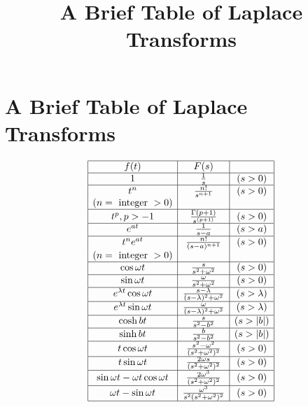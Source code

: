 \documentclass{ximera}
\title{A Brief Table of Laplace Transforms}%
\begin{document}
 
\begin{abstract}
 
\end{abstract}
 
\maketitle
 
\section*{A Brief Table of Laplace Transforms}
 
$$
\begin{array}{|c|c|c|}
\hline
    f(t)  &  F(s)  &   \\
\hline
  1  &  \frac{1}{s} & (s > 0)\\
\hline
  t^n  &  \frac{n!}{s^{n+1}}  & (s > 0) \\
  (n = \text{ integer } > 0)  & & \\
\hline
  t^p,  p > -1  & \frac{\Gamma (p+1)}{s^{(p+1)}} & (s>0) \\
\hline
  e^{at}  &  \frac{1}{s-a}  & (s > a) \\
\hline
  t^ne^{at}  &  \frac{n!}{(s-a)^{n+1}}  & (s > 0) \\
  (n= \text{ integer } > 0)  & & \\
\hline 
  \cos \omega t  & \frac{s}{s^2+\omega^2}  & (s > 0) \\
\hline
 \sin \omega t  & \frac{\omega}{s^2+\omega^2}  & (s > 0) \\
\hline
  e^{\lambda t} \cos \omega t  & \frac{s - \lambda}{(s-\lambda)^2+\omega^2}  & (s >
\lambda) \\
\hline
 e^{\lambda t} \sin \omega t  &
\frac{\omega}{(s-\lambda)^2+\omega^2}  & (s >
\lambda) \\
\hline
  \cosh bt  &  \frac{s}{s^2-b^2}  & (s > |b|)\\
  \hline
  \sinh bt  &  \frac{b}{s^2-b^2}  & (s > |b|) \\
  \hline
 t \cos \omega t  &
\frac{s^2-\omega^2}{(s^2+\omega^2)^2}  & (s>0)\\
\hline
  t \sin \omega t  &
\frac{2\omega s}{(s^2+\omega^2)^2}  & (s>0)\\
\hline
  \sin \omega t -\omega t\cos  \omega t
 & \frac{2\omega^3}{(s^2+\omega^2)^2} & (s>0)\\
 \hline
  \omega t - \sin  \omega t   &
\frac{\omega^3}{s^2(s^2+\omega^2)^2} & (s>0) \\
\hline

\end{array}$$
\end{document}
